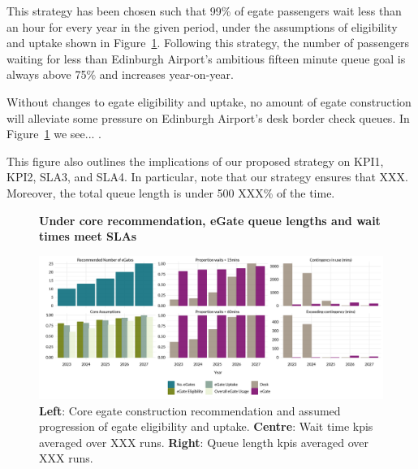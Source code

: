 \documentclass[10pt]{article}
\newcommand*{\figuretitle}[1]{%
    {\centering%
    \textbf{#1}%
    \par\medskip}%
}
\begin{document}


This strategy has been chosen such that 99\% of \gls{egate} passengers wait less than an hour for every year in the given period, under the assumptions of eligibility and uptake shown in Figure~\ref{fig:core_rec_fig}. Following this strategy, the number of passengers waiting for less than Edinburgh Airport's ambitious fifteen minute queue goal is always above 75\% and increases year-on-year. 

Without changes to \gls{egate} eligibility and uptake, no amount of \gls{egate} construction will alleviate some pressure on Edinburgh Airport's desk border check queues. In Figure~\ref{fig:core_rec_fig} we see... .

This figure also outlines the implications of our proposed strategy on KPI1, KPI2, SLA3, and SLA4. In particular, note that our strategy ensures that XXX. Moreover, the total queue length is under 500 XXX\% of the time.

\begin{figure}[!ht]
    \centering
    \figuretitle{Under core recommendation, eGate queue lengths and wait times meet SLAs}
    \includegraphics[width=\textwidth]{figures/core_rec_fig.png}
     \caption{\textbf{Left}: Core \gls{egate} construction recommendation and assumed progression of \gls{egate} eligibility and uptake. \textbf{Centre}: Wait time \glspl{kpi} averaged over XXX runs. \textbf{Right}: Queue length \glspl{kpi} averaged over XXX runs.} \label{fig:core_rec_fig}
\end{figure}
\end{document}
